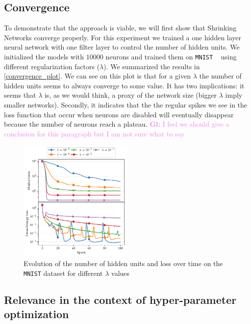 \documentclass[sigconf]{acmart}
\newcommand{\gl}[1]{\textcolor{violet}{{\bf Gl:} #1}}
\begin{document}
\subsection{Convergence}

To demonstrate that the approach is viable, we will first show that Shrinking
Networks converge properly. For this experiment we trained a one hidden layer
neural network with one filter layer to control the number of hidden units. We
initialized the models with $10000$ neurons and trained them on \texttt{MNIST}
~\cite{Lecun1998} using different regularization factors ($\lambda$). We
summarized the results in \autoref{convergence_plot}. We can see on this plot
is that for a given $\lambda$ the number of hidden units seems to always
converge to some value. It has two implications: it seems that $\lambda$ is, as
we would think, a proxy of the network size (bigger $\lambda$ imply smaller
networks). Secondly, it indicates that the  the regular spikes we see in the
loss function that occur when neurons are disabled will eventually disappear
because the number of neurons reach a plateau. \gl{I feel we should give a
  conclusion for this paragraph but I am not sure what to say}
\begin{figure}
\begin{center}
\includegraphics[width=0.5\textwidth]{convergence}
\caption{Evolution of the number of hidden units and loss over time on the \texttt{MNIST} dataset for different $\lambda$ values \label{convergence_plot}}
\end{center}
\end{figure}


\subsection{Relevance in the context of hyper-parameter optimization}
\end{document}
